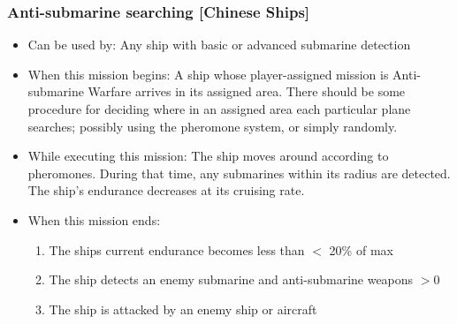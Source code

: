 \documentclass{article}
\begin{document}
    \subsubsection{Anti-submarine searching [Chinese Ships]}
        \begin{itemize}
            \item Can be used by: Any ship with basic or advanced submarine detection
            \item When this mission begins: A ship whose player-assigned mission is Anti-submarine Warfare arrives in its assigned area. There should be some procedure for deciding where in an assigned area each particular plane searches; possibly using the pheromone system, or simply randomly.
            \item While executing this mission: The ship moves around according to pheromones. During that time, any submarines within its radius are detected. The ship's endurance decreases at its cruising rate.
            \item When this mission ends:
                \begin{enumerate}[label=\arabic*)]
                    \item The ships current endurance becomes less than $<$ 20\% of max  \par
                    [Ship mission becomes Transit to Base]
                    \item The ship detects an enemy submarine and anti-submarine weapons $>0$\par
                    [Ship mission becomes Attacking Submarine]
                    \item The ship is attacked by an enemy ship or aircraft \par
                    [Ship mission becomes Transit to Base]
                \end{enumerate}
        \end{itemize}
\end{document}
